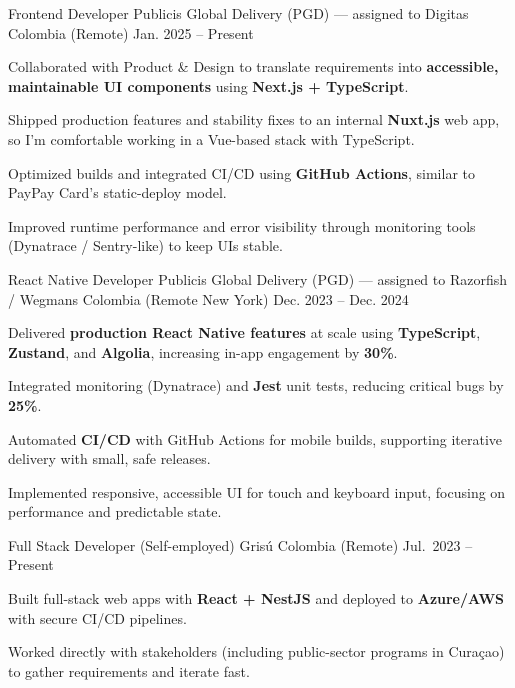 \newcommand{\quotes}[1]{``#1''}

\begin{cventries}

  \cventry
  {Frontend Developer}
  {Publicis Global Delivery (PGD) — assigned to Digitas}
  {Colombia (Remote)}
  {Jan. 2025 -- Present}
  {
    \begin{cvitems}
      \item {Collaborated with Product \& Design to translate requirements into \textbf{accessible, maintainable UI components} using \textbf{Next.js + TypeScript}.}
      \item {Shipped production features and stability fixes to an internal \textbf{Nuxt.js} web app, so I’m comfortable working in a Vue-based stack with TypeScript.}
      \item {Optimized builds and integrated CI/CD using \textbf{GitHub Actions}, similar to PayPay Card’s static-deploy model.}
      \item {Improved runtime performance and error visibility through monitoring tools (Dynatrace / Sentry-like) to keep UIs stable.}
    \end{cvitems}
  }

  \cventry
  {React Native Developer}
  {Publicis Global Delivery (PGD) — assigned to Razorfish / Wegmans}
  {Colombia (Remote \textemdash{} New York)}
  {Dec. 2023 -- Dec. 2024}
  {
    \begin{cvitems}
      \item {Delivered \textbf{production React Native features} at scale using \textbf{TypeScript}, \textbf{Zustand}, and \textbf{Algolia}, increasing in-app engagement by \textbf{30\%}.}
      \item {Integrated monitoring (Dynatrace) and \textbf{Jest} unit tests, reducing critical bugs by \textbf{25\%}.}
      \item {Automated \textbf{CI/CD} with GitHub Actions for mobile builds, supporting iterative delivery with small, safe releases.}
      \item {Implemented responsive, accessible UI for touch and keyboard input, focusing on performance and predictable state.}
    \end{cvitems}
  }

  \cventry
  {Full Stack Developer (Self-employed)}
  {Grisú}
  {Colombia (Remote)}
  {Jul.\ 2023 -- Present}
  {
    \begin{cvitems}
      \item {Built full-stack web apps with \textbf{React + NestJS} and deployed to \textbf{Azure/AWS} with secure CI/CD pipelines.}
      \item {Worked directly with stakeholders (including public-sector programs in Curaçao) to gather requirements and iterate fast.}
    \end{cvitems}
  }


\end{cventries}
